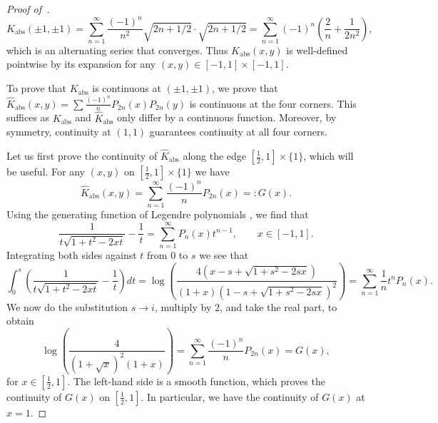 \documentclass{article}
\begin{document}
\begin{proof}[Proof of~]
\begin{equation*}
    K_{\text{abs}}(\pm 1, \pm 1) =\sum_{n=1}^\infty \frac{(-1)^n}{n^2} \sqrt{2n+1/2}\cdot\sqrt{2n+1/2} =  \sum_{n=1}^\infty (-1)^n \left(\frac{2}{n} + \frac{1}{2n^2}\right),
\end{equation*}
which is an alternating series that converges. Thus $K_{\text{abs}}(x,y)$ is well-defined pointwise by its expansion for any $(x,y)\in[-1, 1]\times [-1, 1]$. 

\par To prove that $K_{\text{abs}}$ is continuous at $(\pm 1, \pm 1)$, we prove that $\hat{K}_{\text{abs}}(x, y) = \sum \frac{(-1)^n}{n} P_{2n}(x)P_{2n}(y)$ is continuous at the four corners. This suffices as $K_{\text{abs}}$ and $\hat{K}_{\text{abs}}$ only differ by a continuous function.  Moreover, by symmetry, continuity at $(1, 1)$ guarantees continuity at all four corners.

\par Let us first prove the continuity of $\hat{K}_{\text{abs}}$ along the edge $[\frac{1}{2},1]\times \{1\}$, which will be useful. For any $(x, y)$ on $ [\frac{1}{2}, 1]\times \{1\}$ we have
\begin{equation*}
    \hat{K}_{\text{abs}}(x,y) = \sum_{n=1}^\infty \frac{(-1)^n}{n}P_{2n}(x) =: G(x).
\end{equation*} 
Using the generating function of Legendre polynomials \citep{szeg1939orthogonal}, we find that
\begin{equation*}
    \frac{1}{t\sqrt{1+t^2-2xt}}-\frac{1}{t} = \sum_{n=1}^\infty P_n(x)t^{n-1}, \qquad x\in[-1,1].
\end{equation*}
Integrating both sides against $t$ from $0$ to $s$ we see that
\begin{equation*}
    \int_0^s \left(\frac{1}{t\sqrt{1+t^2-2xt}}-\frac{1}{t}\right)dt =\log\left(\frac{4(x-s+\sqrt{1+s^2-2sx})}{(1+x)(1-s+\sqrt{1+s^2-2sx})^2}\right)=\sum_{n=1}^\infty \frac{1}{n}t^n P_n(x). 
\end{equation*}
We now do the substitution $s\to i$, multiply by $2$, and take the real part, to obtain
\begin{equation}\label{eq:edgeKaform}
    \log\left(\frac{4}{(1+\sqrt{x})^2(1+x)}\right) = \sum_{n=1}^{\infty}\frac{(-1)^n}{n}P_{2n}(x) = G(x),
\end{equation}
for $x\in[\frac{1}{2}, 1]$. The left-hand side is a smooth function, which proves the continuity of $G(x)$ on $[\frac{1}{2},1]$. In particular, we have the continuity of $G(x)$ at $x=1$. 


\end{proof}
\end{document}
